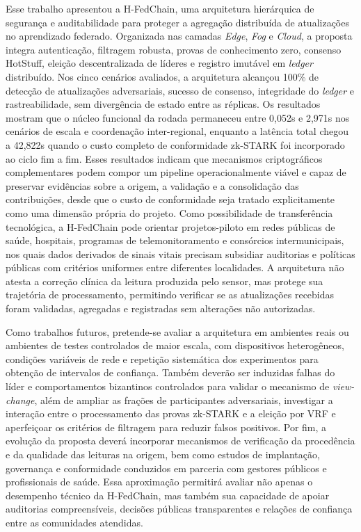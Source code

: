 \documentclass[12pt]{article}
\begin{document}
Esse trabalho apresentou a H-FedChain, uma arquitetura hierárquica de segurança e auditabilidade para proteger a agregação distribuída de atualizações no aprendizado federado. Organizada nas camadas \textit{Edge}, \textit{Fog} e \textit{Cloud}, a proposta integra autenticação, filtragem robusta, provas de conhecimento zero, consenso HotStuff, eleição descentralizada de líderes e registro imutável em \textit{ledger} distribuído. Nos cinco cenários avaliados, a arquitetura alcançou 100\% de detecção de atualizações adversariais, sucesso de consenso, integridade do \textit{ledger} e rastreabilidade, sem divergência de estado entre as réplicas. Os resultados mostram que o núcleo funcional da rodada permaneceu entre 0,052s e 2,971s nos cenários de escala e coordenação inter-regional, enquanto a latência total chegou a 42,822s quando o custo completo de conformidade zk-STARK foi incorporado ao ciclo fim a fim. Esses resultados indicam que mecanismos criptográficos complementares podem compor um pipeline operacionalmente viável e capaz de preservar evidências sobre a origem, a validação e a consolidação das contribuições, desde que o custo de conformidade seja tratado explicitamente como uma dimensão própria do projeto. Como possibilidade de transferência tecnológica, a H-FedChain pode orientar projetos-piloto em redes públicas de saúde, hospitais, programas de telemonitoramento e consórcios intermunicipais, nos quais dados derivados de sinais vitais precisam subsidiar auditorias e políticas públicas com critérios uniformes entre diferentes localidades. A arquitetura não atesta a correção clínica da leitura produzida pelo sensor, mas protege sua trajetória de processamento, permitindo verificar se as atualizações recebidas foram validadas, agregadas e registradas sem alterações não autorizadas.

Como trabalhos futuros, pretende-se avaliar a arquitetura em ambientes reais ou ambientes de testes controlados de maior escala, com dispositivos heterogêneos, condições variáveis de rede e repetição sistemática dos experimentos para obtenção de intervalos de confiança. Também deverão ser induzidas falhas do líder e comportamentos bizantinos controlados para validar o mecanismo de \textit{view-change}, além de ampliar as frações de participantes adversariais, investigar a interação entre o processamento das provas zk-STARK e a eleição por VRF e aperfeiçoar os critérios de filtragem para reduzir falsos positivos. Por fim, a evolução da proposta deverá incorporar mecanismos de verificação da procedência e da qualidade das leituras na origem, bem como estudos de implantação, governança e conformidade conduzidos em parceria com gestores públicos e profissionais de saúde. Essa aproximação permitirá avaliar não apenas o desempenho técnico da H-FedChain, mas também sua capacidade de apoiar auditorias compreensíveis, decisões públicas transparentes e relações de confiança entre as comunidades atendidas.



\end{document}
